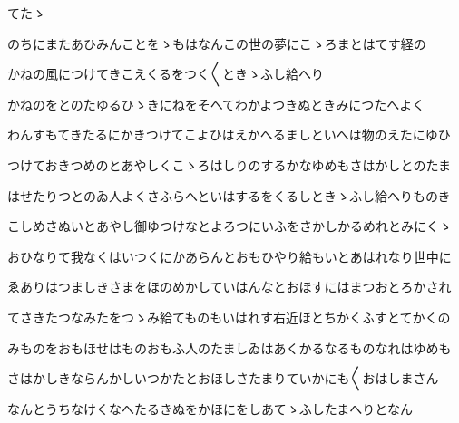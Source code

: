 \documentclass[a4paper,11pt,landscape]{ltjtarticle}
\begin{document}
てたゝ
\par\medskip
のちにまたあひみんことをゝもはなんこの世の夢にこゝろまとはてす経の
\par\medskip
かねの風につけてきこえくるをつく〱ときゝふし給へり
\par\medskip
かねのをとのたゆるひゝきにねをそへてわかよつきぬときみにつたへよく
\par\medskip
わんすもてきたるにかきつけてこよひはえかへるましといへは物のえたにゆひ
\par\medskip
つけておきつめのとあやしくこゝろはしりのするかなゆめもさはかしとのたま
\par\medskip
はせたりつとのゐ人よくさふらへといはするをくるしときゝふし給へりものき
\par\medskip
こしめさぬいとあやし御ゆつけなとよろつにいふをさかしかるめれとみにくゝ
\par\medskip
おひなりて我なくはいつくにかあらんとおもひやり給もいとあはれなり世中に
\par\medskip
ゑありはつましきさまをほのめかしていはんなとおほすにはまつおとろかされ
\par\medskip
てさきたつなみたをつゝみ給てものもいはれす右近ほとちかくふすとてかくの
\par\medskip
みものをおもほせはものおもふ人のたましゐはあくかるなるものなれはゆめも
\par\medskip
さはかしきならんかしいつかたとおほしさたまりていかにも〱おはしまさん
\par\medskip
なんとうちなけくなへたるきぬをかほにをしあてゝふしたまへりとなん
\par\medskip
\end{document}

